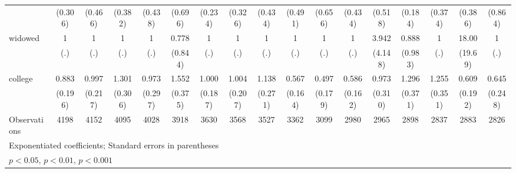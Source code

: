 {\begin{tabular}{l*{16}{c}}
                    &     (0.306)         &     (0.466)         &     (0.382)         &     (0.438)         &     (0.696)         &     (0.234)         &     (0.326)         &     (0.434)         &     (0.491)         &     (0.656)         &     (0.434)         &     (0.518)         &     (0.184)         &     (0.374)         &     (0.386)         &     (0.864)         \\
[1em]
widowed             &           1         &           1         &           1         &           1         &       0.778         &           1         &           1         &           1         &           1         &           1         &           1         &       3.942         &       0.888         &           1         &       18.00\sym{**} &           1         \\
                    &         (.)         &         (.)         &         (.)         &         (.)         &     (0.844)         &         (.)         &         (.)         &         (.)         &         (.)         &         (.)         &         (.)         &     (4.148)         &     (0.983)         &         (.)         &     (19.69)         &         (.)         \\
[1em]
college             &       0.883         &       0.997         &       1.301         &       0.973         &       1.552         &       1.000         &       1.004         &       1.138         &       0.567\sym{*}  &       0.497         &       0.586         &       0.973         &       1.296         &       1.255         &       0.609         &       0.645         \\
                    &     (0.196)         &     (0.217)         &     (0.306)         &     (0.297)         &     (0.375)         &     (0.187)         &     (0.207)         &     (0.271)         &     (0.164)         &     (0.179)         &     (0.162)         &     (0.310)         &     (0.371)         &     (0.351)         &     (0.192)         &     (0.248)         \\
\hline
Observations        &        4198         &        4152         &        4095         &        4028         &        3918         &        3630         &        3568         &        3527         &        3362         &        3099         &        2980         &        2965         &        2898         &        2837         &        2883         &        2826         \\
\hline\hline
\multicolumn{17}{l}{\footnotesize Exponentiated coefficients; Standard errors in parentheses}\\
\multicolumn{17}{l}{\footnotesize \sym{*} \(p<0.05\), \sym{**} \(p<0.01\), \sym{***} \(p<0.001\)}\\
\end{tabular}
}
